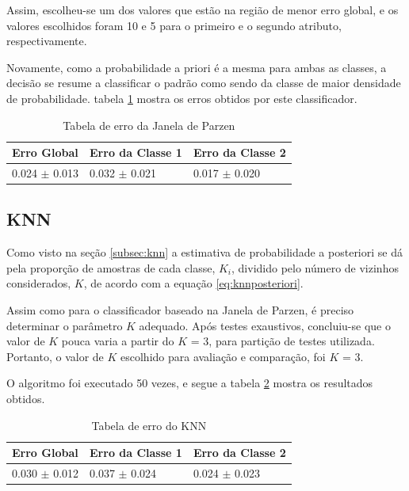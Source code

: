 Assim, escolheu-se um dos valores que estão na região de menor erro global, e os valores escolhidos foram 10 e 5 para o primeiro e o segundo atributo, respectivamente.

Novamente, como a probabilidade a priori é a mesma para ambas as classes, a decisão se resume a classificar o padrão como sendo da classe de maior densidade de probabilidade. tabela \ref{tab:erro-janela-parzen} mostra os erros obtidos por este classificador.

\begin{table}[H]
\begin{center}
\begin{tabular}{|l|l|l|}
\hline
Erro Global			&	Erro da Classe 1	&	Erro da Classe 2	\\
\hline %
0.024 $\pm$ 0.013	&	0.032 $\pm$ 0.021	&	0.017 $\pm$ 0.020	\\
\hline
\end{tabular}%
\end{center}   %
\caption{Tabela de erro da Janela de Parzen}
\label{tab:erro-janela-parzen}
\end{table}

\subsection{KNN}
\label{subsec:exp-knn}

Como visto na seção \ref{subsec:knn} a estimativa de probabilidade a posteriori se dá pela proporção de amostras de cada classe, $K_i$, dividido pelo número de vizinhos considerados, $K$, de acordo com a equação \ref{eq:knnposteriori}.

Assim como para o classificador baseado na Janela de Parzen, é preciso determinar o parâmetro $K$ adequado. Após testes exaustivos, concluiu-se que o valor de $K$ pouca varia a partir do $K$ = 3, para partição de testes utilizada. Portanto, o valor de $K$ escolhido para avaliação e comparação, foi $K$ = 3.

O algoritmo foi executado 50 vezes, e segue a tabela \ref{tab:erro-knn} mostra os resultados obtidos.

\begin{table}[H]
\begin{center}
\begin{tabular}{|l|l|l|}
\hline
Erro Global			&	Erro da Classe 1	&	Erro da Classe 2	\\
\hline %
0.030 $\pm$ 0.012	&	0.037 $\pm$ 0.024	&	0.024 $\pm$ 0.023	\\
\hline
\end{tabular}%
\end{center}   %
\caption{Tabela de erro do KNN}
\label{tab:erro-knn}
\end{table}

